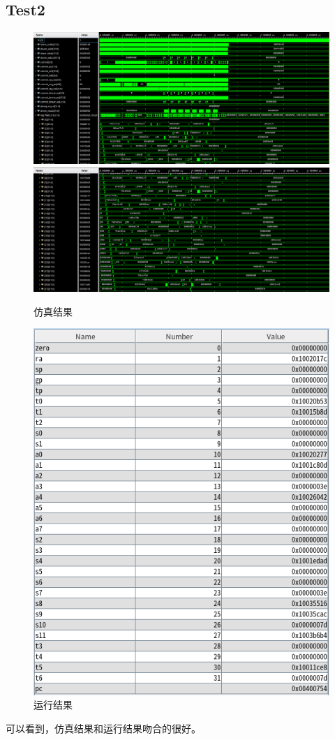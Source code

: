 \documentclass[12pt,a4paper]{ctexart}
\begin{document}
\subsection{Test2}
\begin{figure}[H]
    \centering
    \includegraphics[scale=0.4]{pic/2-1.png}
    \includegraphics[scale=0.4]{pic/2-2.png}
    \caption{仿真结果}
\end{figure}
\begin{figure}[H]
    \centering
    \includegraphics[scale=0.8]{pic/2.png}
    \caption{运行结果}
\end{figure}
可以看到，仿真结果和运行结果吻合的很好。
\end{document}
